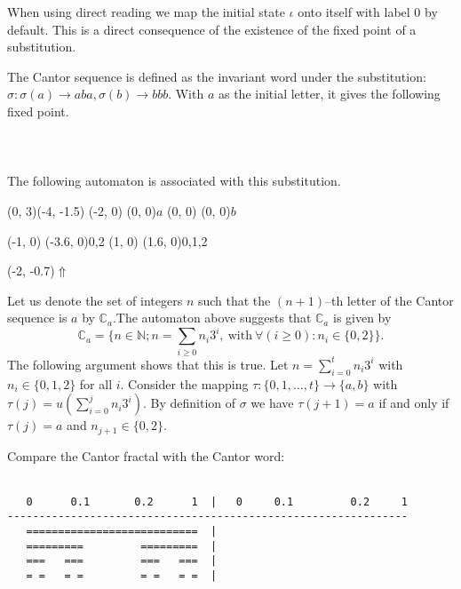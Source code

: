 \documentclass{article}
\begin{document}
\begin{remark}
When using direct reading we map the initial state $\iota$ onto itself with 
label 0 by default. This is a direct consequence of the existence of the fixed
point of a substitution.
\end{remark}

\begin{example}
The Cantor sequence is defined as the invariant word under the substitution: 
$\sigma: \sigma(a) \to aba, \sigma(b) \to bbb$. With $a$ as the
initial letter, it gives the following fixed point.\\
\\
\\
\\
The following automaton is associated with this
substitution.

\begin{graph}(0, 3)(-4, -1.5)
  (-2, 0) (0, 0){$a$}
  (0, 0)  (0, 0){$b$}

  (-1, 0) \freetext(-3.6, 0){0,2}
   
  (1, 0) \freetext(1.6, 0){0,1,2}

  \freetext(-2, -0.7){$\Uparrow$}
\end{graph}

Let us denote the set of integers $n$ such that the $(n + 1)$--th letter of the
Cantor sequence is $a$ by $\mathbb{C}_a$.The automaton above suggests that 
$\mathbb{C}_a$ is given by
\begin{displaymath}
  \mathbb{C}_a = \Big\{n \in \mathbb{N}; n = \sum_{i \ge 0} n_i3^i,
  \mathrm{\ with\ } \forall(i \ge 0): n_i \in \{0, 2\}\Big\}.
\end{displaymath}
The following argument shows that this is true. Let 
$n = \sum_{i = 0}^t n_i 3^i$ with $n_i \in \{0, 1, 2\}$ for all $i$. Consider 
the mapping $\tau: \{0, 1, \ldots, t\} \to \{a, b\}$ with 
$\tau(j) = u(\sum_{i = 0}^j n_i 3^i)$. By definition of $\sigma$ we have 
$\tau(j + 1) = a$ if and only if $\tau(j) = a$ and $n_{j + 1} \in \{0, 2\}$.

Compare the Cantor fractal with the Cantor word:

\ \\
\verb#   0      0.1       0.2      1  |   0     0.1         0.2     1#\\
\verb#---------------------------------------------------------------#\\
\verb#   ===========================  |               #\\
\verb#   =========         =========  |      # { } { } { } { } { } { } { } { } { } { } { } { }\\
\verb#   ===   ===         ===   ===  |   #\\
\verb#   = =   = =         = =   = =  |  #
\end{example}
\end{document}
